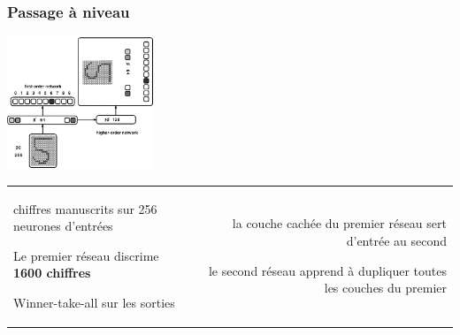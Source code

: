\documentclass[11pt]{beamer}
\newenvironment{noitemize}
{\begin{list}{}{%
\setlength{\labelwidth}{0em}%
\setlength{\labelsep}{2pt}%
\setlength{\leftmargin}{0pt}%
\renewcommand{\makelabel}{\small\color{cloneBlue}{\textbullet}}}}%
{\end{list}}
\newenvironment{minusitemize}
{\begin{list}{}{%
\setlength{\labelwidth}{0em}%
\setlength{\labelsep}{2pt}%
\setlength{\leftmargin}{-15pt}%
\renewcommand{\makelabel}{\small\color{cloneBlue}{\textbullet}}}}%
{\end{list}}
\begin{document}
\begin{frame}
  \frametitle{Passage à niveau}
  \begin{center}
  \includegraphics[height=150px]{../cleeremans_2007/digit_reco/schema_handwritten.png}
  \end{center}

  \begin{center}
  \begin{tabular}{lr}
  \begin{minipage}{150px}
    
    \footnotesize\begin{minusitemize}
     \item chiffres manuscrits sur 256 neurones d'entrées
     \item Le premier réseau discrime \textbf{1600 chiffres}
     \item Winner-take-all sur les sorties
    \end{minusitemize}

    \end{minipage}
    &
    \begin{minipage}{170px}
    \footnotesize\begin{noitemize}
     \item la couche cachée du premier réseau sert d'entrée au second
     \item le second réseau apprend à dupliquer toutes les couches du premier
    \end{noitemize}
    
    \end{minipage}
  \end{tabular}

  \end{center}
  
\end{frame}
\end{document}
